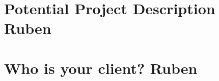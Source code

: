 \documentclass[12pt]{article}
\begin{document}
\section {Potential Project Description Ruben}

\section{Who is your client? Ruben}
\end{document}
